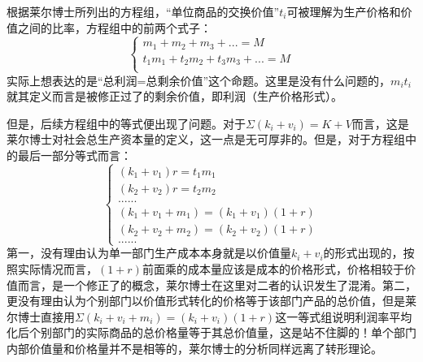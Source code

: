 \documentclass[a4paper,twoside,12pt,AutoFakeBold]{ctexart}
\begin{document}
根据莱尔博士所列出的方程组，“单位商品的交换价值”$t_i$可被理解为生产价格和价值之间的比率，方程组中的前两个式子：
\begin{equation}
\begin{cases}
m_1+m_2+m_3+...=M \\
t_1m_1+t_2m_2+t_3m_3+...=M\\
\end{cases}\tag{1.1}
\end{equation}
实际上想表达的是“总利润=总剩余价值”这个命题。这里是没有什么问题的，$m_it_i$就其定义而言是被修正过了的剩余价值，即利润（生产价格形式）。

但是，后续方程组中的等式便出现了问题。对于$\Sigma (k_i+v_i)=K+V$而言，这是莱尔博士对社会总生产资本量的定义，这一点是无可厚非的。但是，对于方程组中的最后一部分等式而言：
\begin{equation}
    \begin{cases}
        (k_1+v_1)r=t_1m_1\\
(k_2+v_2)r=t_2m_2\\
......\\
(k_1+v_1+m_1)=(k_1+v_1)(1+r)\\
(k_2+v_2+m_2)=(k_2+v_2)(1+r)\\
......
    \end{cases}\tag{1.2}
\end{equation}
第一，没有理由认为单一部门生产成本本身就是以价值量$k_i+v_i$的形式出现的，按照实际情况而言，$(1+r)$前面乘的成本量应该是成本的价格形式，价格相较于价值而言，是一个修正了的概念，莱尔博士在这里对二者的认识发生了混淆。第二，更没有理由认为个别部门以价值形式转化的价格等于该部门产品的总价值，但是莱尔博士直接用$\Sigma(k_i+v_i+m_i)=(k_i+v_i)(1+r)$这一等式组说明利润率平均化后个别部门的实际商品的总价格量等于其总价值量，这是站不住脚的！单个部门内部价值量和价格量并不是相等的，莱尔博士的分析同样远离了转形理论。


\newpage
\end{document}
